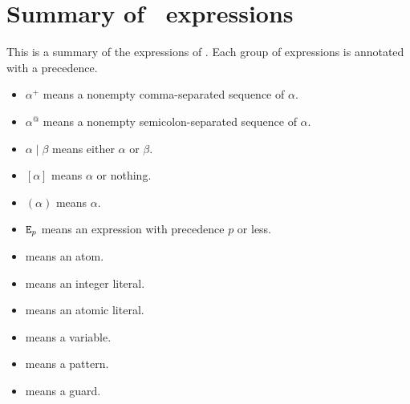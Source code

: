 %
%
%
%
%
%
%

\chapter{Summary of \Erlang\ expressions}

\label{chapter:summary-exprs}

This is a summary of the expressions of \Erlang.  Each group of
expressions is annotated with a precedence.
\begin{itemize}
\item $\alpha^{+}$ means a nonempty comma-separated sequence of $\alpha$.
\item $\alpha^{@}$ means a nonempty semicolon-separated sequence of $\alpha$.
\item $\alpha\mid\beta$ means either $\alpha$ or $\beta$.
\item $[\alpha]$ means $\alpha$ or nothing.
\item $(\alpha)$ means $\alpha$.
\item ${\tt{\sl E}}_p$ means an expression with precedence $p$ or less.
\item {} means an atom.
\item {} means an integer literal.
\item {} means an atomic literal.
\item {} means a variable.
\item {} means a pattern.
\item {} means a guard.
\end{itemize}

